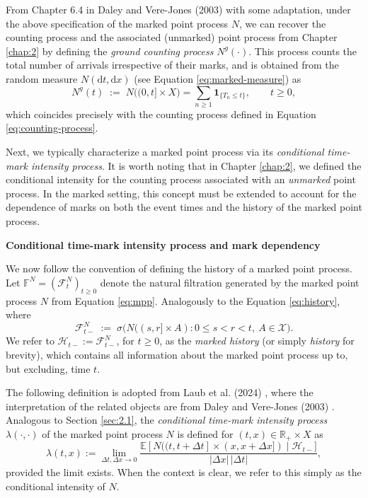 \documentclass[12pt,a4paper]{report}
\theoremstyle{plain}
\theoremstyle{definition}
\theoremstyle{remark}
\newcommand{\1}{\mathbf{1}}
\begin{document}
\medskip
\noindent
From Chapter 6.4 in Daley and Vere-Jones (2003) \cite{DVJ03} with some adaptation, under the above specification of the marked point process $N$, we can recover the counting process and the associated (unmarked) point process from Chapter \ref{chap:2} by defining the \emph{ground counting process} $N^{g}(\cdot)$. This process counts the total number of arrivals irrespective of their marks, and is obtained from the random measure $N(\mathrm{d}t,\mathrm{d}x)$ (see Equation \eqref{eq:marked-measure}) as
\begin{equation}
N^{g}(t)\;:=\;N\bigl((0,t]\times X\bigr)=\sum_{n\ge 1}
\mathbf{1}_{\{T_n\le t\}}, \qquad t\ge0,
\label{eq:ground-counting}
\end{equation}
which coincides precisely with the counting process defined in Equation \eqref{eq:counting-process}.

\medskip
\noindent
Next, we typically characterize a marked point process via its \emph{conditional time-mark intensity process}. It is worth noting that in Chapter \ref{chap:2}, we defined the conditional intensity for the counting process associated with an \emph{unmarked} point process. In the marked setting, this concept must be extended to account for the dependence of marks on both the event times and the history of the marked point process.

\medskip
\noindent
\textbf{Conditional time-mark intensity process and mark dependency}

\medskip
\noindent
We now follow the convention of defining the history of a marked point process. Let $\mathbb{F}^N=(\mathcal{F}^N_t)_{t\ge 0}$ denote the natural filtration generated by the marked point process $N$ from Equation \eqref{eq:mpp}. Analogously to the Equation \eqref{eq:history}, where
\begin{equation}\label{eq:marked-history}
\mathcal{F}^N_{t-} \;:=\; \sigma\bigl( N((s,r]\times A) : 0\le s<r< t,\ A\in\mathcal{X} \bigr).
\end{equation}
We refer to $\mathcal{H}_{t-} := \mathcal{F}^N_{t-}$, for $t\ge 0$, as the \emph{marked history} (or simply \emph{history} for brevity), which contains all information about the marked point process up to, but excluding, time $t$.

\medskip
\noindent
The following definition is adopted from Laub et al. (2024) \cite{LLPT24}, where the interpretation of the related objects are from Daley and Vere-Jones (2003) \cite{DVJ03}. Analogous to Section \ref{sec:2.1}, the \emph{conditional time-mark intensity process} $\lambda(\cdot,\cdot)$ of the marked point process $N$ is defined for $(t,x) \in \mathbb{R}_+ \times X$ as
\[
\lambda(t, x) := \lim_{\Delta t, \Delta x \to 0} \frac{\mathbb{E}[N((t, t + \Delta t] \times (x, x + \Delta x]) \mid \mathcal{H}_{t-}]}{|\Delta x|\,|\Delta t|},
\]
provided the limit exists. When the context is clear, we refer to this simply as the conditional intensity of $N$.
\end{document}
